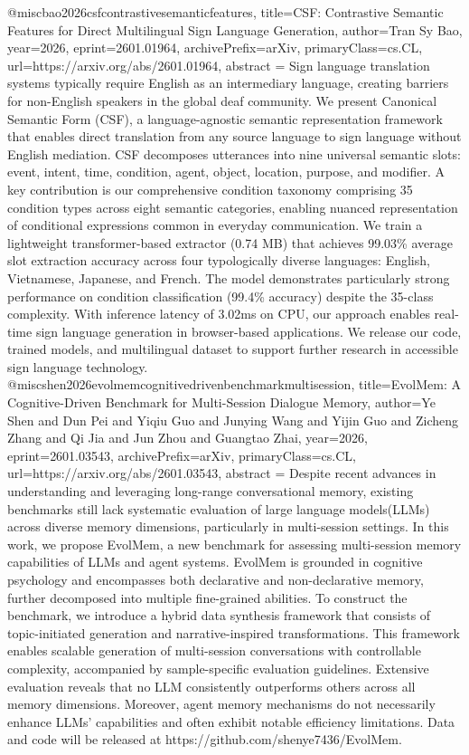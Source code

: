 {}@misc{bao2026csfcontrastivesemanticfeatures,
      title={CSF: Contrastive Semantic Features for Direct Multilingual Sign Language Generation}, 
      author={Tran Sy Bao},
      year={2026},
      eprint={2601.01964},
      archivePrefix={arXiv},
      primaryClass={cs.CL},
      url={https://arxiv.org/abs/2601.01964},
      abstract = {Sign language translation systems typically require English as an intermediary language, creating barriers for non-English speakers in the global deaf community. We present Canonical Semantic Form (CSF), a language-agnostic semantic representation framework that enables direct translation from any source language to sign language without English mediation. CSF decomposes utterances into nine universal semantic slots: event, intent, time, condition, agent, object, location, purpose, and modifier. A key contribution is our comprehensive condition taxonomy comprising 35 condition types across eight semantic categories, enabling nuanced representation of conditional expressions common in everyday communication. We train a lightweight transformer-based extractor (0.74 MB) that achieves 99.03\% average slot extraction accuracy across four typologically diverse languages: English, Vietnamese, Japanese, and French. The model demonstrates particularly strong performance on condition classification (99.4\% accuracy) despite the 35-class complexity. With inference latency of 3.02ms on CPU, our approach enables real-time sign language generation in browser-based applications. We release our code, trained models, and multilingual dataset to support further research in accessible sign language technology.}
}@misc{shen2026evolmemcognitivedrivenbenchmarkmultisession,
      title={EvolMem: A Cognitive-Driven Benchmark for Multi-Session Dialogue Memory}, 
      author={Ye Shen and Dun Pei and Yiqiu Guo and Junying Wang and Yijin Guo and Zicheng Zhang and Qi Jia and Jun Zhou and Guangtao Zhai},
      year={2026},
      eprint={2601.03543},
      archivePrefix={arXiv},
      primaryClass={cs.CL},
      url={https://arxiv.org/abs/2601.03543},
      abstract = {Despite recent advances in understanding and leveraging long-range conversational memory, existing benchmarks still lack systematic evaluation of large language models(LLMs) across diverse memory dimensions, particularly in multi-session settings. In this work, we propose EvolMem, a new benchmark for assessing multi-session memory capabilities of LLMs and agent systems. EvolMem is grounded in cognitive psychology and encompasses both declarative and non-declarative memory, further decomposed into multiple fine-grained abilities. To construct the benchmark, we introduce a hybrid data synthesis framework that consists of topic-initiated generation and narrative-inspired transformations. This framework enables scalable generation of multi-session conversations with controllable complexity, accompanied by sample-specific evaluation guidelines. Extensive evaluation reveals that no LLM consistently outperforms others across all memory dimensions. Moreover, agent memory mechanisms do not necessarily enhance LLMs' capabilities and often exhibit notable efficiency limitations. Data and code will be released at https://github.com/shenye7436/EvolMem.}
}
